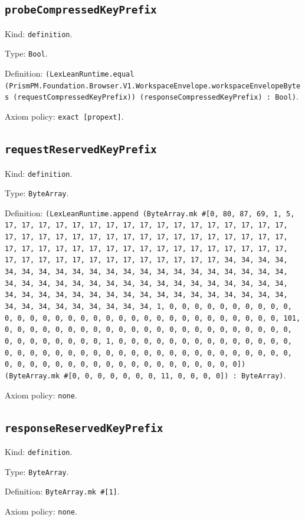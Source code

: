 \documentclass[11pt]{article}
\begin{document}
\subsection*{\texttt{probeCompressedKeyPrefix}}
\noindent Kind: \texttt{definition}.\par
\noindent Type: \texttt{Bool}.\par
\noindent Definition: \texttt{(LexLeanRuntime.equal (PrismPM.Foundation.Browser.V1.WorkspaceEnvelope.workspaceEnvelopeBytes (requestCompressedKeyPrefix)) (responseCompressedKeyPrefix) : Bool)}.\par
\noindent Axiom policy: \texttt{exact [propext]}.\par
\subsection*{\texttt{requestReservedKeyPrefix}}
\noindent Kind: \texttt{definition}.\par
\noindent Type: \texttt{ByteArray}.\par
\noindent Definition: \texttt{(LexLeanRuntime.append (ByteArray.mk \#[0, 80, 87, 69, 1, 5, 17, 17, 17, 17, 17, 17, 17, 17, 17, 17, 17, 17, 17, 17, 17, 17, 17, 17, 17, 17, 17, 17, 17, 17, 17, 17, 17, 17, 17, 17, 17, 17, 17, 17, 17, 17, 17, 17, 17, 17, 17, 17, 17, 17, 17, 17, 17, 17, 17, 17, 17, 17, 17, 17, 17, 17, 17, 17, 17, 17, 17, 17, 17, 17, 34, 34, 34, 34, 34, 34, 34, 34, 34, 34, 34, 34, 34, 34, 34, 34, 34, 34, 34, 34, 34, 34, 34, 34, 34, 34, 34, 34, 34, 34, 34, 34, 34, 34, 34, 34, 34, 34, 34, 34, 34, 34, 34, 34, 34, 34, 34, 34, 34, 34, 34, 34, 34, 34, 34, 34, 34, 34, 34, 34, 34, 34, 34, 34, 1, 0, 0, 0, 0, 0, 0, 0, 0, 0, 0, 0, 0, 0, 0, 0, 0, 0, 0, 0, 0, 0, 0, 0, 0, 0, 0, 0, 0, 0, 0, 0, 0, 101, 0, 0, 0, 0, 0, 0, 0, 0, 0, 0, 0, 0, 0, 0, 0, 0, 0, 0, 0, 0, 0, 0, 0, 0, 0, 0, 0, 0, 0, 0, 0, 1, 0, 0, 0, 0, 0, 0, 0, 0, 0, 0, 0, 0, 0, 0, 0, 0, 0, 0, 0, 0, 0, 0, 0, 0, 0, 0, 0, 0, 0, 0, 0, 0, 0, 0, 0, 0, 0, 0, 0, 0, 0, 0, 0, 0, 0, 0, 0, 0, 0, 0, 0, 0, 0, 0, 0, 0]) (ByteArray.mk \#[0, 0, 0, 0, 0, 0, 0, 11, 0, 0, 0, 0]) : ByteArray)}.\par
\noindent Axiom policy: \texttt{none}.\par
\subsection*{\texttt{responseReservedKeyPrefix}}
\noindent Kind: \texttt{definition}.\par
\noindent Type: \texttt{ByteArray}.\par
\noindent Definition: \texttt{ByteArray.mk \#[1]}.\par
\noindent Axiom policy: \texttt{none}.\par
\end{document}
